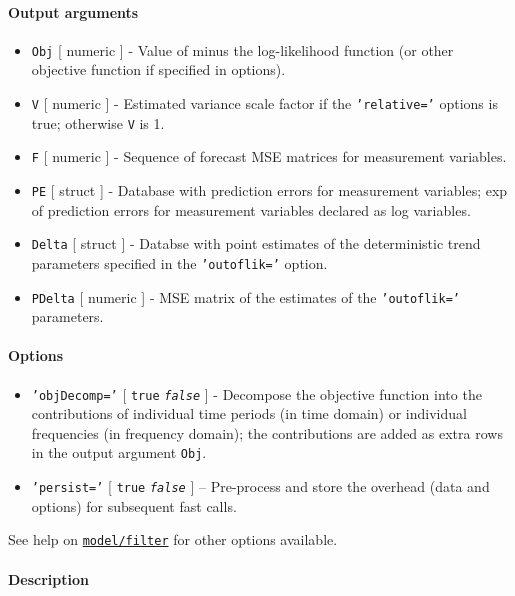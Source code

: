 \paragraph{Output arguments}

\begin{itemize}
\item
  \texttt{Obj} {[} numeric {]} - Value of minus the log-likelihood
  function (or other objective function if specified in options).
\item
  \texttt{V} {[} numeric {]} - Estimated variance scale factor if the
  \texttt{'relative='} options is true; otherwise \texttt{V} is 1.
\item
  \texttt{F} {[} numeric {]} - Sequence of forecast MSE matrices for
  measurement variables.
\item
  \texttt{PE} {[} struct {]} - Database with prediction errors for
  measurement variables; exp of prediction errors for measurement
  variables declared as log variables.
\item
  \texttt{Delta} {[} struct {]} - Databse with point estimates of the
  deterministic trend parameters specified in the \texttt{'outoflik='}
  option.
\item
  \texttt{PDelta} {[} numeric {]} - MSE matrix of the estimates of the
  \texttt{'outoflik='} parameters.
\end{itemize}

\paragraph{Options}

\begin{itemize}
\item
  \texttt{'objDecomp='} {[} \texttt{true} \textbar{}
  \emph{\texttt{false}} {]} - Decompose the objective function into the
  contributions of individual time periods (in time domain) or
  individual frequencies (in frequency domain); the contributions are
  added as extra rows in the output argument \texttt{Obj}.
\item
  \texttt{'persist='} {[} \texttt{true} \textbar{} \emph{\texttt{false}}
  {]} -- Pre-process and store the overhead (data and options) for
  subsequent fast calls.
\end{itemize}

See help on \href{model/filter}{\texttt{model/filter}} for other options
available.

\paragraph{Description}

